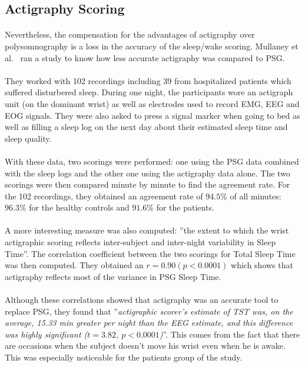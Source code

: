 \documentclass[a4paper,12pt]{article}
\begin{document}
\subsection{Actigraphy Scoring}

\paragraph{}
Nevertheless, the compensation for the advantages of actigraphy over polysomnography is a loss in the accuracy of the sleep/wake scoring. Mullaney et al.~\cite{Mullaney1980} ran a study to know how less accurate actigraphy was compared to PSG.

\paragraph{}
They worked with 102 recordings including 39 from hospitalized patients which suffered disturbered sleep. During one night, the participants wore an actigraph unit (on the dominant wrist) as well as electrodes used to record EMG, EEG and EOG signals. They were also asked to press a signal marker when going to bed as well as filling a sleep log on the next day about their estimated sleep time and sleep quality.

\paragraph{}
With these data, two scorings were performed: one using the PSG data combined with the sleep logs and the other one using the actigraphy data alone. The two scorings were then compared minute by minute to find the agreement rate. For the 102 recordings, they obtained an agreement rate of $94.5\%$ of all minutes: $96.3\%$ for the healthy controls and $91.6\%$ for the patients.

\paragraph{}
A more interesting measure was also computed: ''the extent to which the wrist actigraphic scoring reflects inter-subject and inter-night variability in Sleep Time''\cite{Mullaney1980}. The correlation coefficient between the two scorings for Total Sleep Time was then computed. They obtained an $r = 0.90 (p < 0.0001)$ which shows that actigraphy reflects most of the variance in PSG Sleep Time.

\paragraph{}
Although these correlations showed that actigraphy was an accurate tool to replace PSG, they found that ''\textit{actigraphic scorer's estimate of TST was, on the average, 15.33 min greater per night than the EEG estimate, and this difference was highly significant ($t = 3.82$, $p < 0.0001$)}''. This comes from the fact that there are occasions when the subject doesn't move his wrist even when he is awake. This was especially noticeable for the patients group of the study.
\end{document}
